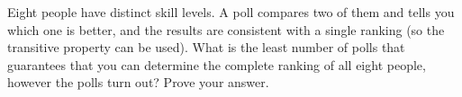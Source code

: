 Eight people have distinct skill levels. A poll compares two of them and tells you which one is better, and the results are consistent with a single ranking (so the transitive property can be used). What is the least number of polls that guarantees that you can determine the complete ranking of all eight people, however the polls turn out? Prove your answer.
